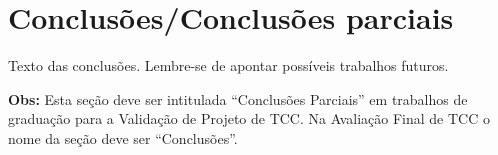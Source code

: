 	\section{Conclusões/Conclusões parciais}
	
	Texto das conclusões. Lembre-se de apontar possíveis trabalhos futuros.
	
	\textbf{Obs:} Esta seção deve ser intitulada ``Conclusões Parciais'' em trabalhos de graduação para a Validação de Projeto de TCC. Na Avaliação Final de TCC o nome da seção deve ser ``Conclusões''.
    
    
    

